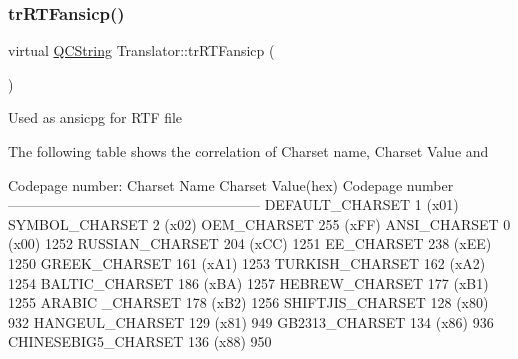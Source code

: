 \subsubsection{\texorpdfstring{trRTFansicp()}{trRTFansicp()}}
{\footnotesize\ttfamily virtual \mbox{\hyperlink{class_q_c_string}{Q\+C\+String}} Translator\+::tr\+R\+T\+Fansicp (\begin{DoxyParamCaption}{ }\end{DoxyParamCaption})\hspace{0.3cm}{\ttfamily [pure virtual]}}

Used as ansicpg for R\+TF file

The following table shows the correlation of Charset name, Charset Value and 
\begin{DoxyPre}
Codepage number:
Charset Name       Charset Value(hex)  Codepage number
------------------------------------------------------
DEFAULT\_CHARSET           1 (x01)
SYMBOL\_CHARSET            2 (x02)
OEM\_CHARSET             255 (xFF)
ANSI\_CHARSET              0 (x00)            1252
RUSSIAN\_CHARSET         204 (xCC)            1251
EE\_CHARSET              238 (xEE)            1250
GREEK\_CHARSET           161 (xA1)            1253
TURKISH\_CHARSET         162 (xA2)            1254
BALTIC\_CHARSET          186 (xBA)            1257
HEBREW\_CHARSET          177 (xB1)            1255
ARABIC \_CHARSET         178 (xB2)            1256
SHIFTJIS\_CHARSET        128 (x80)             932
HANGEUL\_CHARSET         129 (x81)             949
GB2313\_CHARSET          134 (x86)             936
CHINESEBIG5\_CHARSET     136 (x88)             950
\end{DoxyPre}
 

